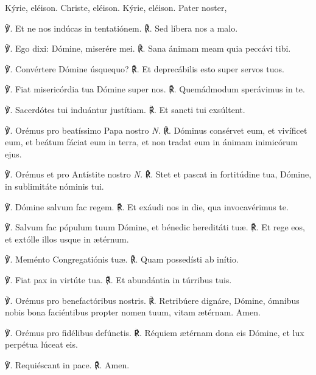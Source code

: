
\label{preces}Kýrie, eléison. Christe, eléison. Kýrie, eléison. Pater noster, 


℣. Et ne nos indúcas in tentatiónem. ℟. Sed líbera nos a malo.

℣. Ego dixi: Dómine, miserére mei. ℟. Sana ánimam meam quia peccávi tibi.

℣. Convértere Dómine úsquequo?
℟. Et deprecábilis esto super servos tuos.

℣. Fiat misericórdia tua Dómine super nos.
℟. Quemádmodum sperávimus in te.

℣. Sacerdótes tui induántur justítiam.
℟. Et sancti tui exsúltent.

℣. Orémus pro beatíssimo Papa nostro \textit{N.}
℟. Dóminus consérvet eum, et vivíficet eum, et beátum fáciat eum in terra, et non tradat eum in ánimam inimicórum ejus.

℣. Orémus et pro Antístite nostro \textit{N.}
℟. Stet et pascat in fortitúdine tua, Dómine, in sublimitáte nóminis tui.


℣. Dómine salvum fac regem.
℟. Et exáudi nos in die, qua invocavérimus te.

℣. Salvum fac pópulum tuum Dómine, et bénedic hereditáti tuæ.
℟. Et rege eos, et extólle illos usque in ætérnum.

℣. Meménto Congregatiónis tuæ.
℟. Quam possedísti ab inítio.

℣. Fiat pax in virtúte tua.
℟. Et abundántia in túrribus tuis.

℣. Orémus pro benefactóribus nostris.
℟. Retribúere dignáre, Dómine, ómnibus nobis bona faciéntibus propter nomen tuum, vitam ætérnam. Amen.

℣. Orémus pro fidélibus defúnctis.
℟. Réquiem ætérnam dona eis Dómine, et lux perpétua lúceat eis.

℣. Requiéscant in pace.
℟. Amen.

